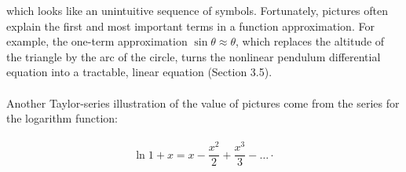 \documentclass{book}
\newcounter{pro1}
\begin{document}
\large\textrm{which looks like an unintuitive sequence of symbols.
Fortunately, pictures often explain the first and most
important terms in a function approximation. For example, the one-term
approximation $\sin\theta\approx\theta$, which replaces the altitude of the triangle by
the arc of the circle, turns the nonlinear pendulum differential equation
into a tractable, linear equation (Section 3.5).}\\
\\
\large\textrm{Another Taylor-series illustration of the value of pictures come from the
series for the logarithm function:}\\
\\
\begin {equation}\label{formula4.29}
\ln{1+x}=x-\frac{x^{2}}{2}+\frac{x^{3}}{3}-\dots\cdot
\end{equation}
\newpage
\fancyhf{} 

\end{document}
